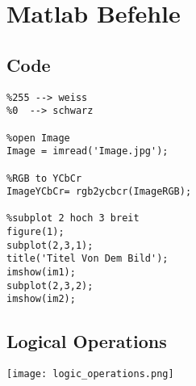 \section{Matlab Befehle}
\subsection{Code}
\begin{lstlisting}
%255 --> weiss 
%0 	--> schwarz

%open Image
Image = imread('Image.jpg'); 

%RGB to YCbCr
ImageYCbCr= rgb2ycbcr(ImageRGB);

%subplot 2 hoch 3 breit
figure(1);
subplot(2,3,1);
title('Titel Von Dem Bild'); 
imshow(im1);
subplot(2,3,2);
imshow(im2);
\end{lstlisting}

\subsection{Logical Operations}
\texttt{[image: logic\_operations.png]}